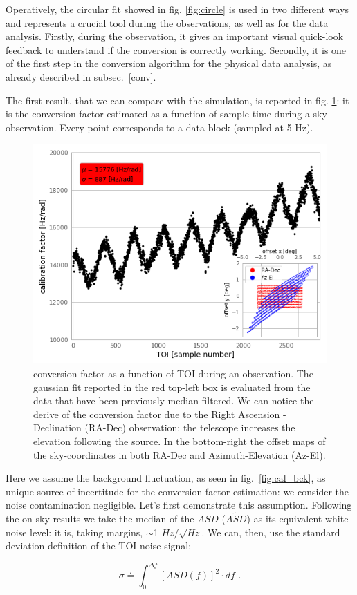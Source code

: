 \documentclass[twocolumn,traditabstract]{aa}\\
\begin{document}
\noindent Operatively, the circular fit showed in fig. \ref{fig:circle} is used in two different ways and represents a crucial tool during the observations, as well as for the data analysis. Firstly, during the observation, it gives an important visual quick-look feedback to understand if the conversion is correctly working. Secondly, it is one of the first step in the conversion algorithm for the physical data analysis, as already described in subsec.~\ref{conv}.

The first result, that we can compare with the simulation, is reported in fig. \ref{fig:calfact}: it is the conversion factor estimated as a function of sample time during a sky observation. Every point corresponds to a data block (sampled at 5 Hz).

\begin{figure}[htf]
	\centering
	\includegraphics[width=.5\textwidth]{4.results/calfact.png}
	\caption{conversion factor as a function of TOI during an observation. The gaussian fit reported in the red top-left box is evaluated from the data that have been previously median filtered. We can notice the derive of the conversion factor due to the Right Ascension - Declination (RA-Dec) observation: the telescope increases the elevation following the source. In the bottom-right the offset maps of the sky-coordinates in both RA-Dec and Azimuth-Elevation (Az-El).}
	\label{fig:calfact}
\end{figure}


Here we assume the background fluctuation, as seen in fig.~\ref{fig:cal_bck}, as unique source of incertitude for the conversion factor estimation: we consider the noise contamination negligible. Let's first demonstrate this assumption. Following the on-sky results we take the median of the $ASD$ ($\tilde{ASD}$) as its equivalent white noise level: it is, taking margins, $\sim$1 $Hz/\sqrt{Hz}$.
\noindent  We can, then, use the standard deviation definition of the TOI noise signal:

\begin{equation}
\sigma \doteq \int_{0}^{\Delta f} \left[ASD(f) \right]^2\cdot df \text{ .}
\label{eq:sigma}
\end{equation}
\end{document}

